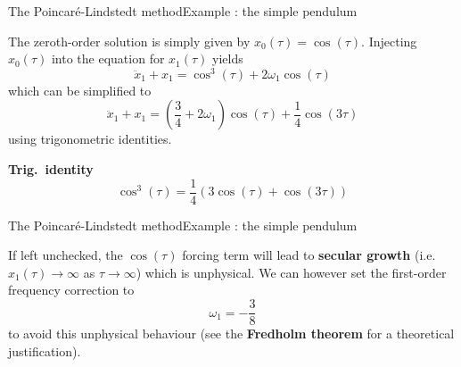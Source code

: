 \documentclass[usenames,dvipsnames,svgnames,10pt,aspectratio=169]{beamer}
\begin{document}
\begin{frame}[t, c]{The Poincaré-Lindstedt method}{Example : the simple pendulum}
  \begin{minipage}{.58\textwidth}
    The zeroth-order solution is simply given by $x_0(\tau) = \cos(\tau)$.
    Injecting $x_0(\tau)$ into the equation for $x_1(\tau)$ yields
    \[
    \ddot{x}_1 + x_1 = \cos^3(\tau) + 2\omega_1 \cos(\tau)
    \]
    which can be simplified to
    \[
    \ddot{x}_1 + x_1 = \left( \dfrac{3}{4} + 2\omega_1 \right) \cos(\tau) + \dfrac{1}{4} \cos(3\tau)
    \]
    using trigonometric identities.
  \end{minipage}%
  \hfill
  \begin{minipage}{.38\textwidth}
    \centering
    \textbf{Trig.\ identity}
    \[
    \cos^3(\tau) = \dfrac{1}{4}\left( 3 \cos(\tau) + \cos(3\tau) \right)
    \]
  \end{minipage}

  \vspace{1cm}
\end{frame}

\begin{frame}[t, c]{The Poincaré-Lindstedt method}{Example : the simple pendulum}
  \begin{minipage}{.68\textwidth}
    If left unchecked, the $\cos(\tau)$ forcing term will lead to \alert{\textbf{secular growth}} (i.e. $x_1(\tau) \to \infty$ as $\tau \to \infty$) which is unphysical.
    We can however set the first-order frequency correction to
    \[
    \omega_1 = - \dfrac{3}{8}
    \]
    to avoid this unphysical behaviour (see the \alert{\textbf{Fredholm theorem}} for a theoretical justification).
  \end{minipage}%
  \hfill
  \begin{minipage}{.28\textwidth}
    \centering
  \end{minipage}

  \vspace{1cm}
\end{frame}
\end{document}
